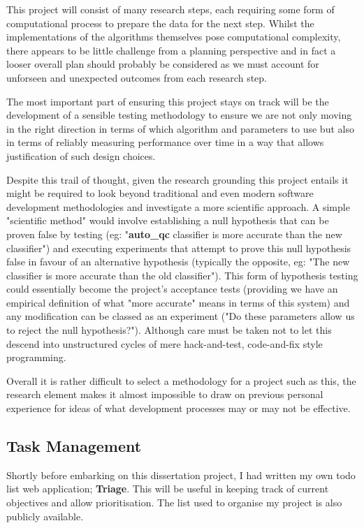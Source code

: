 This project will consist of many research steps, each requiring some form of
computational process to prepare the data for the next step. Whilst the
implementations of the algorithms themselves pose computational complexity,
there appears to be little challenge from a planning perspective and in fact a
looser overall plan should probably be considered as we must account for
unforseen and unexpected outcomes from each research step.

The most important part of ensuring this project stays on track will be the
development of a sensible testing methodology to ensure we are not only moving
in the right direction in terms of which algorithm and parameters to use but
also in terms of reliably measuring performance over time in a way that allows
justification of such design choices.

Despite this trail of thought, given the research grounding this project entails
it might be required to look beyond traditional and even modern software
development methodologies and investigate a more scientific approach. A simple
"scientific method" would involve establishing a null hypothesis that can be
proven false by testing (eg: "\textbf{auto\_qc} classifier is more
accurate than the new classifier") and executing experiments that
attempt to prove this null hypothesis false in favour of an alternative
hypothesis (typically the opposite, eg: "The new classifier is more
accurate than the old classifier"). This form of hypothesis testing
could essentially become the project's acceptance tests (providing we have an
empirical definition of what "more accurate" means in terms of this
system) and any modification can be classed as an experiment ("Do these
parameters allow us to reject the null hypothesis?").  Although care must be
taken not to let this descend into unstructured cycles of mere hack-and-test,
code-and-fix style programming.

Overall it is rather difficult to select a methodology for a project such as
this, the research element makes it almost impossible to draw on previous
personal experience for ideas of what development processes may or may not be
effective.

\subsection{Task Management}
Shortly before embarking on this dissertation project, I had written my own todo
list web application; \textbf{Triage}\citep{github:triage}. This will be useful
in keeping track of current objectives and allow prioritisation. The list used to
organise my project is also publicly available\citep{sam:triage}.

